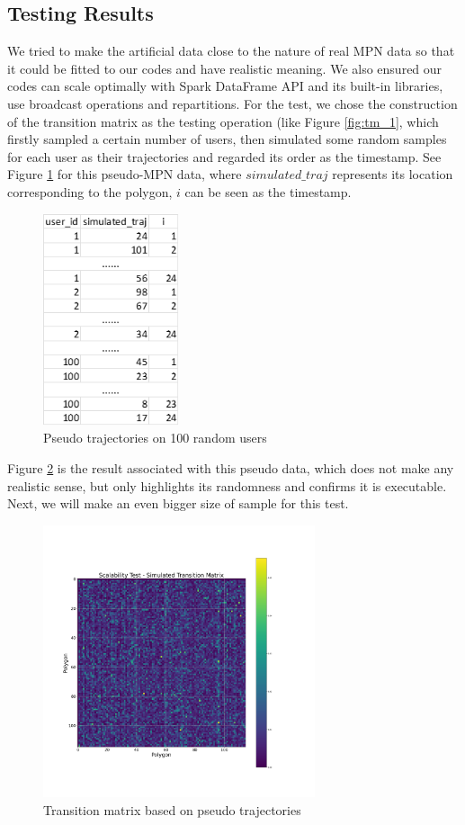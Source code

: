 \documentclass[12pt]{article}
\theoremstyle{definition}
\begin{document}
\subsection{Testing Results}
We tried to make the artificial data close to the nature of real MPN data so that it could be fitted to our codes and have realistic meaning. We also ensured our codes can scale optimally with Spark DataFrame API and its built-in libraries, use broadcast operations and repartitions. For the test, we chose the construction of the transition matrix as the testing operation (like Figure \ref{fig:tm_1}, which firstly sampled a certain number of users, then simulated some random samples for each user as their trajectories and regarded its order as the timestamp. See Figure \ref{fig:pseudo_traj} for this pseudo-MPN data, where \(simulated\_traj\) represents its location corresponding to the polygon, \(i\) can be seen as the timestamp.

\begin{figure}
  \centering
  \includegraphics[width=4cm]{pseudo_data.jpg}
  \caption{Pseudo trajectories on 100 random users}
  \label{fig:pseudo_traj}
\end{figure}

Figure \ref{fig:reform_tm} is the result associated with this pseudo data, which does not make any realistic sense, but only highlights its randomness and confirms it is executable. Next, we will make an even bigger size of sample for this test.

\begin{figure}
  \centering
  \includegraphics[width=8cm]{TEST_TM.png}
  \caption{Transition matrix based on pseudo trajectories}
  \label{fig:reform_tm}
\end{figure}
\end{document}
